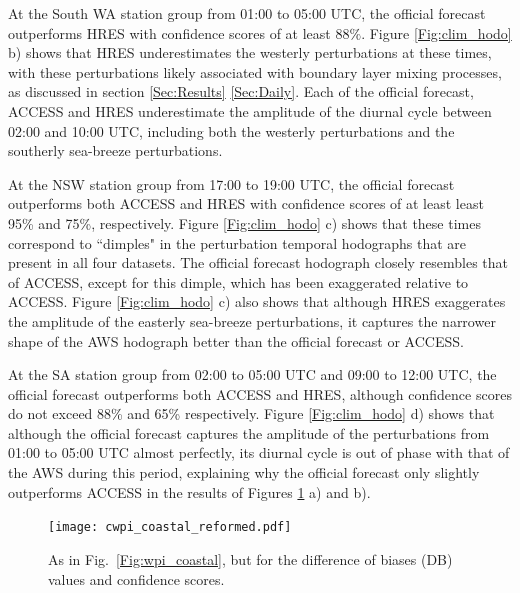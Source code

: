 \documentclass[twocol]{ametsoc}
\begin{document}
At the South WA station group from 01:00 to 05:00 UTC, the official forecast outperforms HRES with confidence scores of at least $88\%$. Figure \ref{Fig:clim_hodo} b) shows that HRES underestimates the westerly perturbations at these times, with these perturbations likely associated with boundary layer mixing processes, as discussed in section \ref{Sec:Results} \ref{Sec:Daily}. Each of the official forecast, ACCESS and HRES underestimate the amplitude of the diurnal cycle between 02:00 and 10:00 UTC, including both the westerly perturbations and the southerly sea-breeze perturbations. 

At the NSW station group from 17:00 to 19:00 UTC, the official forecast outperforms both ACCESS and HRES with confidence scores of at least least 95\% and 75\%, respectively. Figure \ref{Fig:clim_hodo} c) shows that these times correspond to ``dimples" in the perturbation temporal hodographs that are present in all four datasets. The official forecast hodograph closely resembles that of ACCESS, except for this dimple, which has been exaggerated relative to ACCESS. Figure \ref{Fig:clim_hodo} c) also shows that although HRES exaggerates the amplitude of the easterly sea-breeze perturbations, it captures the narrower shape of the AWS hodograph better than the official forecast or ACCESS.

At the SA station group from 02:00 to 05:00 UTC and 09:00 to 12:00 UTC, the official forecast outperforms both ACCESS and HRES, although confidence scores do not exceed 88\% and 65\% respectively. Figure \ref{Fig:clim_hodo} d) shows that although the official forecast captures the amplitude of the perturbations from 01:00 to 05:00 UTC almost perfectly, its diurnal cycle is out of phase with that of the AWS during this period, explaining why the official forecast only slightly outperforms ACCESS in the results of Figures \ref{Fig:cwpi_coastal} a) and b).

\begin{figure}
\centering
\texttt{[image: cwpi\_coastal\_reformed.pdf]}
\caption{As in Fig.~\ref{Fig:wpi_coastal}, but for the difference of biases (DB) values and confidence scores.}
\label{Fig:cwpi_coastal}
\end{figure}
\end{document}
